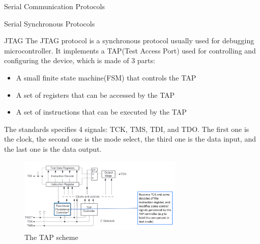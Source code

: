 \begin{section}{Serial Communication Protocols}
\begin{subsection}{Serial Synchronous Protocols}
    \begin{subsubsection}{JTAG}
      The JTAG protocol is a synchronous protocol usually used for debugging microcontroller. It
      implements a TAP(Test Access Port) used for controlling and configuring the device, which is
      made of 3 parts:
      \begin{itemize}
        \item A small finite state machine(FSM) that controls the TAP
        \item A set of registers that can be accessed by the TAP
        \item A set of instructions that can be executed by the TAP
      \end{itemize}

      The standards specifies 4 signals: TCK, TMS, TDI, and TDO. The first one is the clock, the
      second one is the mode select, the third one is the data input, and the last one is the data
      output. 

      \begin{figure}[H]
        \centering
        \includegraphics[width=0.7\textwidth]{img/hardware/tap scheme.png}
        \caption{The TAP scheme}
      \end{figure}


\end{subsubsection}
\end{subsection}
\end{section}
